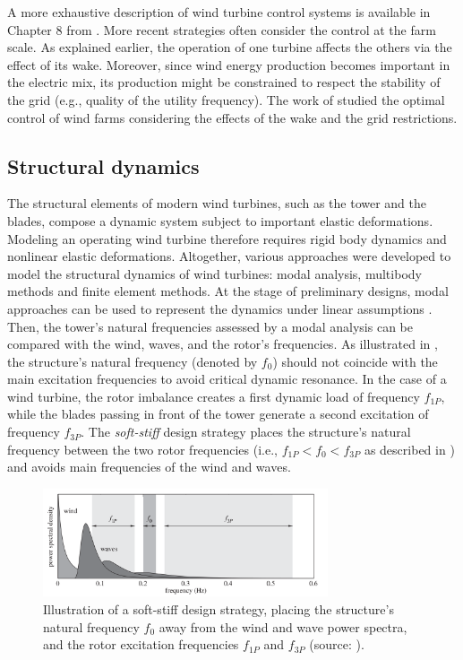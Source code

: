 A more exhaustive description of wind turbine control systems is available in Chapter 8 from \citet{burton_2021_wind_handbook}. 
More recent strategies often consider the control at the farm scale. 
As explained earlier, the operation of one turbine affects the others via the effect of its wake. 
Moreover, since wind energy production becomes important in the electric mix, its production might be constrained to respect the stability of the grid (e.g., quality of the utility frequency).  
The work of \citet{gionfra_2018_control} studied the optimal control of wind farms considering the effects of the wake and the grid restrictions. 

\subsection{Structural dynamics}

The structural elements of modern wind turbines, such as the tower and the blades, compose a dynamic system subject to important elastic deformations. 
Modeling an operating wind turbine therefore requires rigid body dynamics and nonlinear elastic deformations. 
Altogether, various approaches were developed to model the structural dynamics of wind turbines: modal analysis, multibody methods and finite element methods. 
At the stage of preliminary designs, modal approaches can be used to represent the dynamics under linear assumptions \citep{hegseth_2019_modal_FOWT}. 
Then, the tower's natural frequencies assessed by a modal analysis can be compared with the wind, waves, and the rotor's frequencies. 
As illustrated in , the structure's natural frequency (denoted by $f_0$) should not coincide with the main excitation frequencies to avoid critical dynamic resonance.
In the case of a wind turbine, the rotor imbalance creates a first dynamic load of frequency $f_{1P}$, while the blades passing in front of the tower generate a second excitation of frequency $f_{3P}$.  
The \textit{soft-stiff} design strategy places the structure's natural frequency between the two rotor frequencies (i.e., $f_{1P} < f_0 < f_{3P}$ as described in ) and avoids main frequencies of the wind and waves. 
\begin{figure}
    \centering
    \includegraphics[width=0.75\textwidth]{./part1/figures/modal_analysis.png}
    \caption{Illustration of a soft-stiff design strategy, placing the structure's natural frequency $f_0$ away from the wind and wave power spectra, and the rotor excitation frequencies $f_{1P}$ and $f_{3P}$ (source: \citealp{kallehave_2015_modal}).}
    \label{fig:modal_analysis}
\end{figure}

